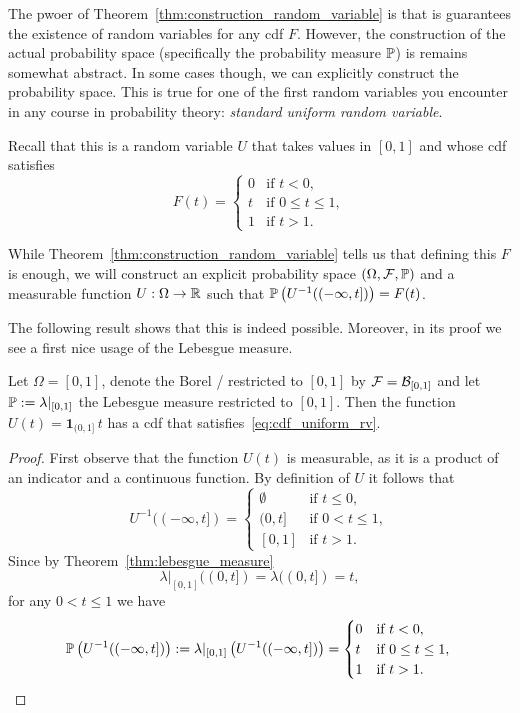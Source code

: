 
The pwoer of Theorem~\ref{thm:construction_random_variable} is that is guarantees the existence of random variables for any cdf $F$. However, the construction of the actual probability space (specifically the probability measure $\mathbb P$) is remains somewhat abstract. In some cases though, we can explicitly construct the probability space. This is true for one of the first random variables you encounter in any course in probability theory: \emph{standard uniform random variable}. 

Recall that this is a random variable $U$ that takes values in $[0,1]$ and whose cdf satisfies 
\begin{equation}\label{eq:cdf_uniform_rv}
	F(t) = \begin{cases}
		0 &\text{if } t < 0,\\
		t &\text{if } 0 \le t\le 1,\\
		1 &\text{if } t > 1.
	\end{cases}
\end{equation}

While Theorem~\ref{thm:construction_random_variable} tells us that defining this $F$ is enough, we will construct an explicit probability space $(\Omega,\mathcal F, \mathbb P)$ and a measurable function $U : \Omega \to \mathbb R$ such that $	\mathbb P\left(U^{-1}((-\infty,t])\right) = F(t)$.

The following result shows that this is indeed possible. Moreover, in its proof we see a first nice usage of the Lebesgue measure.

\begin{lemma}\label{lem:uniform_random_variable}
Let $\Omega = [0,1]$, denote the Borel \sigalg/ restricted to $[0,1]$ by $\mathcal F = \mathcal B_{[0,1]}$ and let $\mathbb P := \lambda|_{[0,1]}$ the Lebesgue measure restricted to $[0,1]$. Then the function $U(t) = \mathbf{1}_{(0,1]} \, t$ has a cdf that satisfies~\eqref{eq:cdf_uniform_rv}.
\end{lemma}

\begin{proof}
First observe that the function $U(t)$ is measurable, as it is a product of an indicator and a continuous function. By definition of $U$ it follows that
\[
	U^{-1}((-\infty,t]) = \begin{cases}
		\emptyset &\text{if } t \le 0,\\
		(0,t] &\text{if } 0 < t \le 1, \\
		[0,1] &\text{if } t > 1.
	\end{cases}
\]
Since by Theorem~\ref{thm:lebesgue_measure}
\[
	\lambda|_{[0,1]}((0,t]) = \lambda((0,t]) = t,
\]
for any $0 < t \le 1$ we have
\[
	\mathbb P\left(U^{-1}((-\infty,t])\right) := \lambda|_{[0,1]}\left(U^{-1}((-\infty,t])\right)
	= \begin{cases}
		0 &\text{if } t < 0,\\
		t &\text{if } 0 \le t\le 1,\\
		1 &\text{if } t > 1.
	\end{cases}\qedhere
\]
\end{proof}

